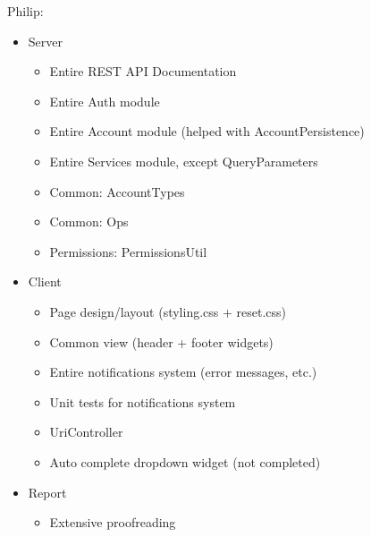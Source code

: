 Philip:
\begin{itemize}
	\item Server
	\begin{itemize}
		\item Entire REST API Documentation
		\item Entire Auth module
		\item Entire Account module (helped with AccountPersistence)
		\item Entire Services module, except QueryParameters
		\item Common: AccountTypes
		\item Common: Ops
		\item Permissions: PermissionsUtil
	\end{itemize}
	\item Client
	\begin{itemize}
		\item Page design/layout (styling.css + reset.css)
		\item Common view (header + footer widgets)
		\item Entire notifications system (error messages, etc.)
		\item Unit tests for notifications system
		\item UriController
		\item Auto complete dropdown widget (not completed)
	\end{itemize}
	\item Report
	\begin{itemize}
		\item Extensive proofreading
	\end{itemize}
\end{itemize} 